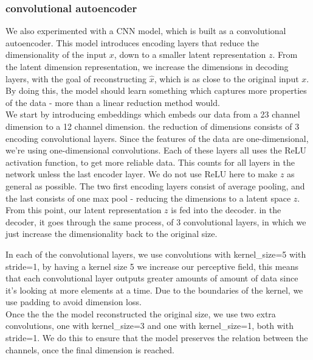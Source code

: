 \subsubsection{convolutional autoencoder}

We also experimented with a CNN model, which is built as a convolutional autoencoder. This model introduces encoding layers that reduce the dimensionality of the input $x$, down to a smaller latent representation $z$. From the latent dimension representation, we increase the dimensions in decoding layers, with the goal of reconstructing $\hat{x}$, which is as close to the original input $x$. By doing this, the model should learn something which captures more properties of the data - more than a linear reduction method would. \\

\noindent
We start by introducing embeddings which embeds our data from a 23 channel dimension to a 12 channel dimension. the reduction of dimensions consists of 3 encoding convolutional layers. Since the features of the data are one-dimensional, we're using one-dimensional convolutions. Each of these layers all uses the ReLU activation function, to get more reliable data. This counts for all layers in the network unless the last encoder layer. We do not use ReLU here to make $z$ as general as possible. The two first encoding layers consist of average pooling, and the last consists of one max pool - reducing the dimensions to a latent space $z$.  \\


\noindent
From this point, our latent representation $z$ is fed into the decoder. in the decoder, it goes through the same process, of 3 convolutional layers, in which we just increase the dimensionality back to the original size.

\noindent
In each of the convolutional layers, we use convolutions with kernel\_size=5 with stride=1, by having a kernel size 5 we increase our perceptive field, this means that each convolutional layer outputs greater amounts of amount of data since it's looking at more elements at a time. Due to the boundaries of the kernel, we use padding to avoid dimension loss.\\

\noindent
Once the the the model reconstructed the original size, we use two extra convolutions, one with kernel\_size=3 and one with kernel\_size=1, both with stride=1. We do this to ensure that the model preserves the relation between the channels, once the final dimension is reached.





